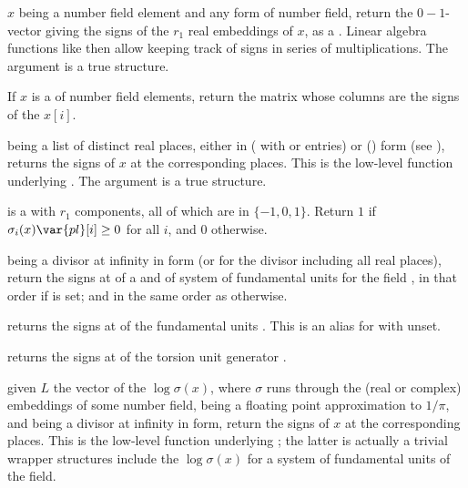  $x$ being a number field element and 
any form of number field, return the $0-1$-vector giving the signs of the
$r_1$ real embeddings of $x$, as a . Linear algebra functions
like  then allow keeping track of signs in series of
multiplications. The argument  is a true  structure.

If $x$ is a  of number field elements, return the matrix whose
columns are the signs of the $x[i]$.

  being a list of
distinct real places, either in  ( with  or
 entries) or  () form (see
), returns the signs of $x$ at the corresponding
places. This is the low-level function underlying . The argument
 is a true  structure.

  is a
 with $r_1$ components, all of which are in $\{-1,0,1\}$.
Return $1$ if $\sigma_i(x) \var{pl}[i] \geq 0$ for all $i$, and $0$ otherwise.

 being a divisor at infinity in  form (or 
for the divisor including all real places), return the signs at 
of a  and of system of fundamental units for the field
, in that order if  is set; and in the same order as
 otherwise.

 returns the signs at 
of the fundamental units . This is an alias for
 with  unset.

 returns the signs at 
of the torsion unit generator .

 given $L$
the vector of the $\log \sigma(x)$, where $\sigma$ runs through the (real
or complex) embeddings of some number field,  being
a floating point approximation to $1/\pi$, and  being a divisor
at infinity in  form, return the signs of $x$
at the corresponding places. This is the low-level function underlying
; the latter is actually a trivial wrapper
 structures include the $\log \sigma(x)$ for a system of fundamental
units of the field.

